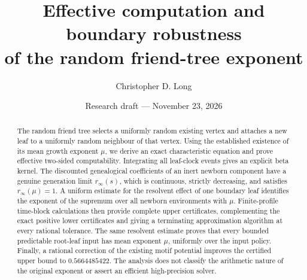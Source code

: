 \documentclass[11pt]{article}
\title{Effective computation and boundary robustness\\
of the random friend-tree exponent}
\author{Christopher D. Long}
\date{Research draft --- November 23, 2026}
\theoremstyle{definition}
\theoremstyle{remark}
\begin{document}
\maketitle
\begin{abstract}
The random friend tree selects a uniformly random existing vertex and
attaches a new leaf to a uniformly random neighbour of that vertex.
Using the established existence of its mean growth exponent $\mu$, we
derive an exact characteristic equation and prove effective two-sided
computability. Integrating all leaf-clock events gives an explicit
beta kernel. The discounted genealogical coefficients of an inert
newborn component have a genuine generation limit $r_\infty(s)$,
which is continuous, strictly decreasing, and satisfies
$r_\infty(\mu)=1$. A uniform estimate for the resolvent effect of one
boundary leaf identifies the exponent of the supremum over all newborn
environments with $\mu$. Finite-profile time-block calculations then
provide complete upper certificates, complementing the exact positive
lower certificates and giving a terminating approximation algorithm
at every rational tolerance. The same resolvent estimate proves that
every bounded predictable root-leaf input has mean exponent $\mu$,
uniformly over the input policy. Finally, a rational correction of
the existing motif potential improves the certified upper bound to
$0.5664485422$. The analysis does not classify the arithmetic nature
of the original exponent or assert an efficient high-precision solver.
\end{abstract}
\clearpage
\setcounter{tocdepth}{1}
\tableofcontents
\clearpage





















\end{document}
